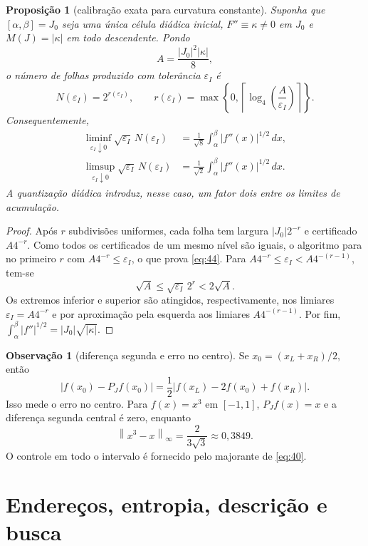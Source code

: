 \documentclass[11pt,a4paper]{article}
\theoremstyle{preciso}
\newtheorem{proposicao}[teorema]{Proposição}
\theoremstyle{definition}
\newtheorem{observacao}[teorema]{Observação}
\newcommand{\norm}[1]{\left\|#1\right\|_{\infty}}
\newcommand{\eqn}[2]{\begin{equation}\label{eq:#1}#2\end{equation}}
\begin{document}
\begin{proposicao}[calibração exata para curvatura constante]
Suponha que $[\alpha,\beta]=J_0$ seja uma única célula diádica inicial, $F''\equiv\kappa\ne0$ em $J_0$ e $M(J)=|\kappa|$ em todo descendente. Pondo
\[
A=\frac{|J_0|^2|\kappa|}8,
\]
o número de folhas produzido com tolerância $\varepsilon_I$ é
\eqn{44}{N(\varepsilon_I)=2^{r(\varepsilon_I)},\qquad
r(\varepsilon_I)=\max\left\{0,\left\lceil\log_4\left(\frac A{\varepsilon_I}\right)\right\rceil\right\}.}
Consequentemente,
\eqn{45}{\begin{aligned}
\liminf_{\varepsilon_I\downarrow0}\sqrt{\varepsilon_I}\,N(\varepsilon_I)
&=\frac1{\sqrt8}\int_\alpha^\beta|f''(x)|^{1/2}\,dx,\\
\limsup_{\varepsilon_I\downarrow0}\sqrt{\varepsilon_I}\,N(\varepsilon_I)
&=\frac1{\sqrt2}\int_\alpha^\beta|f''(x)|^{1/2}\,dx.
\end{aligned}}
A quantização diádica introduz, nesse caso, um fator dois entre os limites de acumulação.
\end{proposicao}
\begin{proof}
Após $r$ subdivisões uniformes, cada folha tem largura $|J_0|2^{-r}$ e certificado $A4^{-r}$. Como todos os certificados de um mesmo nível são iguais, o algoritmo para no primeiro $r$ com $A4^{-r}\le\varepsilon_I$, o que prova \eqref{eq:44}. Para $A4^{-r}\le\varepsilon_I<A4^{-(r-1)}$, tem-se
\[
\sqrt A\le\sqrt{\varepsilon_I}\,2^r<2\sqrt A.
\]
Os extremos inferior e superior são atingidos, respectivamente, nos limiares $\varepsilon_I=A4^{-r}$ e por aproximação pela esquerda aos limiares $A4^{-(r-1)}$. Por fim, $\int_\alpha^\beta|f''|^{1/2}=|J_0|\sqrt{|\kappa|}$.
\end{proof}

\begin{observacao}[diferença segunda e erro no centro]
Se $x_0=(x_L+x_R)/2$, então
\[
|f(x_0)-P_Jf(x_0)|=\frac12|f(x_L)-2f(x_0)+f(x_R)|.
\]
Isso mede o erro no centro. Para $f(x)=x^3$ em $[-1,1]$, $P_Jf(x)=x$ e a diferença segunda central é zero, enquanto
\[
\norm{x^3-x}=\frac2{3\sqrt3}\approx0{,}3849.
\]
O controle em todo o intervalo é fornecido pelo majorante de \eqref{eq:40}.
\end{observacao}



\section{Endereços, entropia, descrição e busca}
\end{document}
